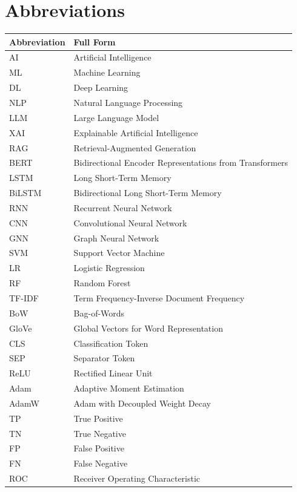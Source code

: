 \sloppy
\pagestyle{fancy}
\chapter*{\centering Abbreviations}

\begin{longtable}{L{1.6in} L{4.0in}}
\textbf{Abbreviation} & \textbf{Full Form} \\
\hline
\endhead
AI & Artificial Intelligence \\
ML & Machine Learning \\
DL & Deep Learning \\
NLP & Natural Language Processing \\
LLM & Large Language Model \\
XAI & Explainable Artificial Intelligence \\
RAG & Retrieval-Augmented Generation \\
BERT & Bidirectional Encoder Representations from Transformers \\
LSTM & Long Short-Term Memory \\
BiLSTM & Bidirectional Long Short-Term Memory \\
RNN & Recurrent Neural Network \\
CNN & Convolutional Neural Network \\
GNN & Graph Neural Network \\
SVM & Support Vector Machine \\
LR & Logistic Regression \\
RF & Random Forest \\
TF-IDF & Term Frequency-Inverse Document Frequency \\
BoW & Bag-of-Words \\
GloVe & Global Vectors for Word Representation \\
CLS & Classification Token \\
SEP & Separator Token \\
ReLU & Rectified Linear Unit \\
Adam & Adaptive Moment Estimation \\
AdamW & Adam with Decoupled Weight Decay \\
TP & True Positive \\
TN & True Negative \\
FP & False Positive \\
FN & False Negative \\
ROC & Receiver Operating Characteristic \\

\end{longtable}
